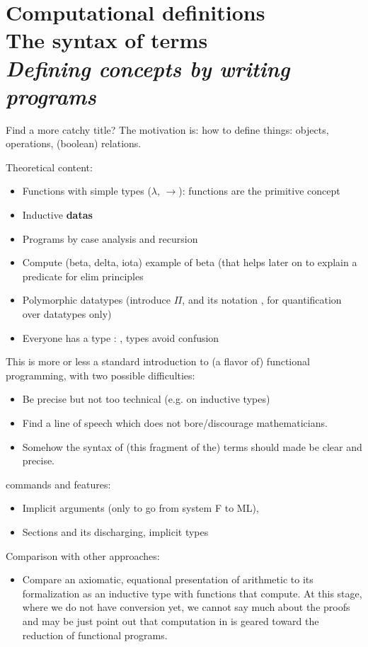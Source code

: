 \chapter{Computational definitions \\ The syntax of terms \\[2ex]\Large\itshape Defining concepts by writing programs} 

Find a more catchy title? The motivation is: how to define things:
objects, operations, (boolean) relations.

Theoretical content:
\begin{itemize}
\item Functions with simple types ($\lambda$, $\rightarrow$): functions are the primitive concept
\item Inductive {\bf datas}
\item Programs by case analysis and recursion
\item Compute (beta, delta, iota) example of beta (that helps later on to explain a predicate for elim principles
\item Polymorphic datatypes (introduce $\Pi$, and its \Coq{} notation
  , for quantification over datatypes only)
\item Everyone has a type : , types avoid confusion
\end{itemize}
This is more or less a standard introduction to (a flavor of)
functional programming, with two possible difficulties:
\begin{itemize}
\item Be precise but not too technical (e.g. on inductive types)
\item Find a line of speech which does not bore/discourage
  mathematicians.
\item Somehow the syntax of (this fragment of the) terms should made
  be clear and precise.
\end{itemize}

\Coq{} commands and features:
\begin{itemize}
\item Implicit arguments (only to go from system F to ML), 
\item Sections and its discharging, implicit types
\end{itemize}

Comparison with other approaches:
\begin{itemize}
\item Compare an axiomatic, equational presentation of arithmetic to
  its formalization as an inductive type with functions that
  compute. At this stage, where we do not have conversion yet, we
  cannot say much about the proofs and may be just point out that
  computation in \Coq{} is geared toward the reduction of functional
  programs.
\end{itemize}

